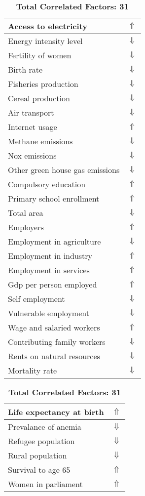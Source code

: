\documentclass[12pt,notitlepage,oneside]{report}
\begin{document}
\begin{table}[!htb]
\caption{\textbf{Shows Symptom: Headaches $\Uparrow$}}
\centering
\label{Correlated Socio-economic Factors0}
\begin{tabular}{|l|l|}
\hline
Access to electricity & $\Uparrow$\\ \hline
Energy intensity level & $\Downarrow$\\ \hline
Fertility of women & $\Downarrow$\\ \hline
Birth rate & $\Downarrow$\\ \hline
Fisheries production & $\Downarrow$\\ \hline
Cereal production & $\Downarrow$\\ \hline
Air transport  & $\Downarrow$\\ \hline
Internet usage & $\Uparrow$\\ \hline
Methane emissions & $\Downarrow$\\ \hline
Nox emissions & $\Downarrow$\\ \hline
Other green house gas emissions & $\Downarrow$\\ \hline
Compulsory education & $\Uparrow$\\ \hline
Primary school enrollment & $\Uparrow$\\ \hline
Total area & $\Downarrow$\\ \hline
Employers & $\Uparrow$\\ \hline
Employment in agriculture & $\Downarrow$\\ \hline
Employment in industry & $\Uparrow$\\ \hline
Employment in services & $\Uparrow$\\ \hline
Gdp per person employed & $\Uparrow$\\ \hline
Self employment & $\Downarrow$\\ \hline
Vulnerable employment & $\Downarrow$\\ \hline
Wage and salaried workers & $\Uparrow$\\ \hline
Contributing family workers & $\Downarrow$\\ \hline
Rents on natural resources & $\Downarrow$\\ \hline
Mortality rate & $\Downarrow$\\ \hline
\end{tabular}
\begin{tabular}{|l|l|}
\hline
Life expectancy at birth & $\Uparrow$\\ \hline
Prevalance of anemia & $\Downarrow$\\ \hline
Refugee population & $\Downarrow$\\ \hline
Rural population & $\Downarrow$\\ \hline
Survival to age 65 & $\Uparrow$\\ \hline
Women in parliament & $\Uparrow$\\ \hline
\end{tabular}
\caption*{\textbf{Total Correlated Factors: 31}}
\end{table}
\end{document}
